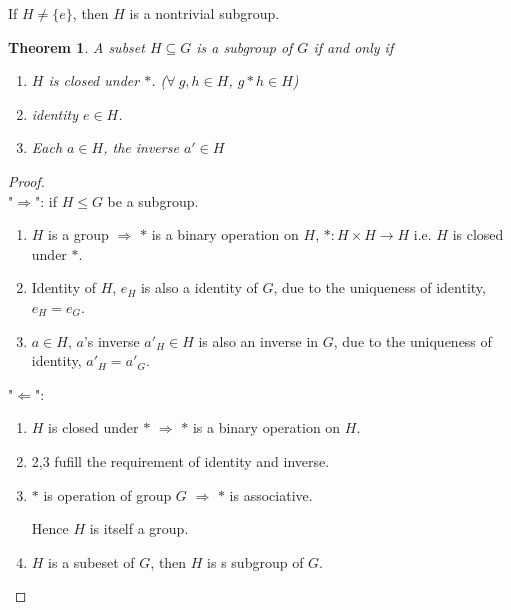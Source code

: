 \documentclass[11pt,a4paper]{article}
\newtheorem{theorem}{Theorem}
\begin{document}
If $H\neq\{e\}$, then $H$ is a nontrivial subgroup.

\begin{theorem}
    A subset $H\subseteq G$ is a subgroup of $G$ if and only if
    \begin{enumerate}
        \item $H$ is closed under $*$. ($\forall\ g,h\in H$, $g*h\in H$)
        \item identity $e\in H$.
        \item Each $a\in H$, the inverse $a'\in H$
    \end{enumerate}
\end{theorem}
\begin{proof}
\quad\\
"$\Rightarrow$": if $H\leq G$ be a subgroup.
\begin{enumerate}
    \item $H$ is a group $\Rightarrow$ $*$ is a binary operation on $H$, $*:H\times H \rightarrow H$ i.e. $H$ is closed under $*$.
    \item Identity of $H$, $e_H$ is also a identity of $G$, due to the uniqueness of identity, $e_H=e_G$.
    \item $a\in H$, $a$'s inverse $a'_H\in H$ is also an inverse in $G$, due to the uniqueness of identity, $a'_H=a'_G$.
\end{enumerate}
"$\Leftarrow$":
\begin{enumerate}
    \item $H$ is closed under $*$ $\Rightarrow	$ $*$ is a binary operation on $H$.
    \item 2,3 fufill the requirement of identity and inverse.
    \item $*$ is operation of group $G$ $\Rightarrow$ $*$ is associative.
    
    Hence $H$ is itself a group.
    \item $H$ is a subeset of $G$, then $H$ is s subgroup of $G$.
\end{enumerate}
\end{proof}
\end{document}
